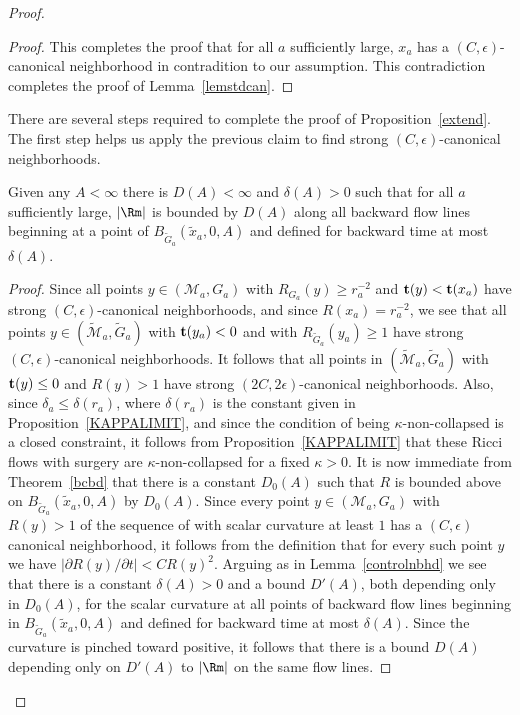 \begin{proof}
\begin{proof}
This completes the proof that for all $a$ sufficiently large, $x_a$
has a $(C,\epsilon)$-canonical neighborhood in contradition to our
assumption. This contradiction completes the proof of
Lemma~\ref{lemstdcan}.
\end{proof}




There are several steps required to complete the proof of
Proposition~\ref{extend}. The first step helps us apply the previous claim to
find strong $(C,\epsilon)$-canonical neighborhoods.


\begin{claim}
\label{claim:curvature-bound-along-backward-flow-lines}\label{D(A)delta(A)}
Given any $A<\infty$ there is $D(A)<\infty$ and $\delta(A)>0$ such that for all $a$
sufficiently large, $|\Rm|$ is bounded by $D(A)$ along all backward flow lines
beginning at a point of $B_{\widetilde
G_a}(\tilde x_a,0,A)$ and defined for backward time at most $\delta(A)$.
\end{claim}

\begin{proof}
Since all points  $y\in ({\mathcal M}_a,G_a)$ with $R_{G_a}(y)\ge
r^{-2}_a$ and ${\bf t}(y)<{\bf t}(x_a)$ have strong
$(C,\epsilon)$-canonical neighborhoods, and since $R(x_a)=r^{-2}_a$,
we see that all points $y\in (\widetilde{\mathcal M}_a,\widetilde
G_a)$ with ${\bf t}(y_a)<0$ and with $R_{\tilde G_a}(y_a)\ge 1$ have
strong $(C,\epsilon)$-canonical neighborhoods. It follows that all
points in $(\widetilde {\mathcal M}_a,\widetilde G_a)$ with ${\bf
t}(y)\le 0$ and $R(y)>1$ have strong $(2C,2\epsilon)$-canonical
neighborhoods. Also, since $\delta_a\le \delta(r_a)$, where
$\delta(r_a)$ is the constant given in Proposition~\ref{KAPPALIMIT},
and since the condition of being $\kappa$-non-collapsed is a closed
constraint, it follows from Proposition~\ref{KAPPALIMIT} that these
Ricci flows with surgery are $\kappa$-non-collapsed for a fixed
$\kappa>0$. It is now immediate from Theorem~\ref{bcbd} that there
is a constant $D_0(A)$ such that $R$ is bounded above on
$B_{\widetilde G_a}(\tilde x_a,0,A)$ by $D_0(A)$. Since every point
$y\in ({\mathcal M}_a,G_a)$ with $R(y)>1$ of the sequence of with
scalar curvature at least $1$ has a $(C,\epsilon)$ canonical
neighborhood, it follows from the definition that for every such
point $y$ we have $\left|\partial R(y)/\partial t\right|<CR(y)^2$.
Arguing as in Lemma~\ref{controlnbhd} we see that there is a
constant $\delta(A)>0$ and a bound $D'(A)$, both depending only in
$D_0(A)$,
 for the scalar curvature at all points
of backward flow lines beginning in $B_{\widetilde
G_a}(\tilde x_a,0,A)$ and defined for backward time at most $\delta(A)$. Since the curvature is pinched toward positive,
it follows that there is a bound $D(A)$ depending only on $D'(A)$ to $|\Rm|$ on the same flow lines.
\end{proof}


\end{proof}
